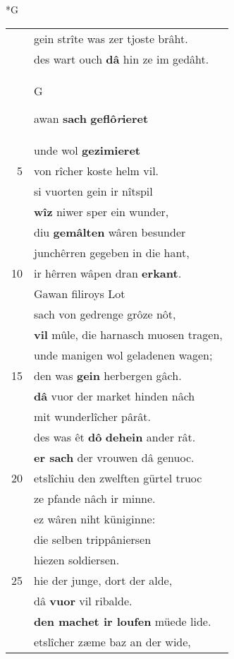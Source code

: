\documentclass[8pt,a4paper,notitlepage]{article}
\begin{document}
\begin{table}[ht]
\begin{minipage}[t]{0.5\linewidth}
\small
\begin{center}*G
\end{center}
\begin{tabular}{rl}
 & gein strîte was zer tjoste brâht.\\ 
 & des wart ouch \textbf{dâ} hin ze im gedâht.\\ 
 & \begin{large}G\end{large}awan \textbf{sach} \textbf{geflô\textit{r}ieret}\\ 
 & unde wol \textbf{gezimieret}\\ 
5 & von rîcher koste helm vil.\\ 
 & si vuorten gein ir nîtspil\\ 
 & \textbf{wîz} niwer sper ein wunder,\\ 
 & diu \textbf{gemâlten} wâren besunder\\ 
 & junchêrren gegeben in die hant,\\ 
10 & ir hêrren wâpen dran \textbf{erkant}.\\ 
 & Gawan filiroys Lot\\ 
 & sach von gedrenge grôze nôt,\\ 
 & \textbf{vil} mûle, die harnasch muosen tragen,\\ 
 & unde manigen wol geladenen wagen;\\ 
15 & den was \textbf{gein} herbergen gâch.\\ 
 & \textbf{dâ} vuor der market hinden nâch\\ 
 & mit wunderlîcher pârât.\\ 
 & des was êt \textbf{dô} \textbf{dehein} ander rât.\\ 
 & \textbf{er sach} der vrouwen dâ genuoc.\\ 
20 & etslîchiu den zwelften gürtel truoc\\ 
 & ze pfande nâch ir minne.\\ 
 & ez wâren niht küniginne:\\ 
 & die selben trippâniersen\\ 
 & hiezen soldiersen.\\ 
25 & hie der junge, dort der alde,\\ 
 & dâ \textbf{vuor} vil ribalde.\\ 
 & \textbf{den machet ir loufen} müede lide.\\ 
 & etslîcher zæme baz an der wide,\\ 

\end{tabular}
\end{minipage}
\end{table}
\end{document}
